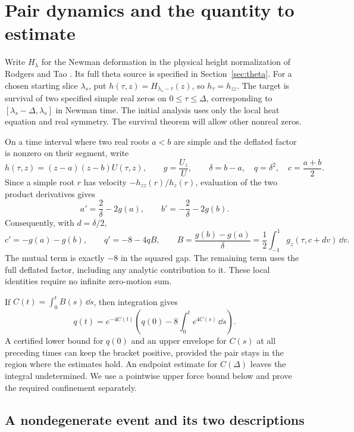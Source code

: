\section{Pair dynamics and the quantity to estimate}
\label{sec:geometry}

Write \(H_\lambda\) for the Newman deformation in the physical height
normalization of Rodgers and Tao \cite{RodgersTao}. Its full theta source
is specified in Section~\ref{sec:theta}. For a chosen starting slice
\(\lambda_s\), put \(h(\tau,z)=H_{\lambda_s-\tau}(z)\), so \(h_\tau=h_{zz}\).
The target is survival of two specified simple real zeros on
\(0\le\tau\le\Delta\), corresponding to
\([\lambda_s-\Delta,\lambda_s]\) in Newman time. The initial analysis
uses only the local heat equation and real symmetry. The survival
theorem will allow other nonreal zeros.

On a time interval where two real roots \(a<b\) are simple and the
deflated factor is nonzero on their segment, write
\[
h(\tau,z)=(z-a)(z-b)U(\tau,z),\qquad
g=\frac{U_z}{U},\qquad
\delta=b-a,\quad q=\delta^2,\quad c=\frac{a+b}{2}.
\]
Since a simple root \(r\) has velocity \(-h_{zz}(r)/h_z(r)\),
evaluation of the two product derivatives gives
\[
a'=\frac{2}{\delta}-2g(a),\qquad
b'=-\frac{2}{\delta}-2g(b).
\]
Consequently, with \(d=\delta/2\),
\begin{equation}
\label{eq:gap-law}
c'=-g(a)-g(b),\qquad q'=-8-4qB,\qquad
B=\frac{g(b)-g(a)}{\delta}
  =\frac12\int_{-1}^1 g_z(\tau,c+dv)\,\dd v .
\end{equation}
The mutual term is exactly \(-8\) in the squared gap. The remaining
term uses the full deflated factor, including any analytic contribution
to it. These local identities require no infinite zero-motion sum.

If \(C(t)=\int_0^t B(s)\,\dd s\), then integration gives
\begin{equation}
\label{eq:gap-integral}
q(t)=e^{-4C(t)}\left(q(0)-8\int_0^t e^{4C(s)}\,\dd s\right).
\end{equation}
A certified lower bound for \(q(0)\) and an upper envelope for \(C(s)\)
at all preceding times can keep the bracket positive, provided the pair
stays in the region where the estimates hold. An endpoint estimate for
\(C(\Delta)\) leaves the integral undetermined. We use a pointwise upper
force bound below and prove the required confinement separately.

\subsection{A nondegenerate event and its two descriptions}

